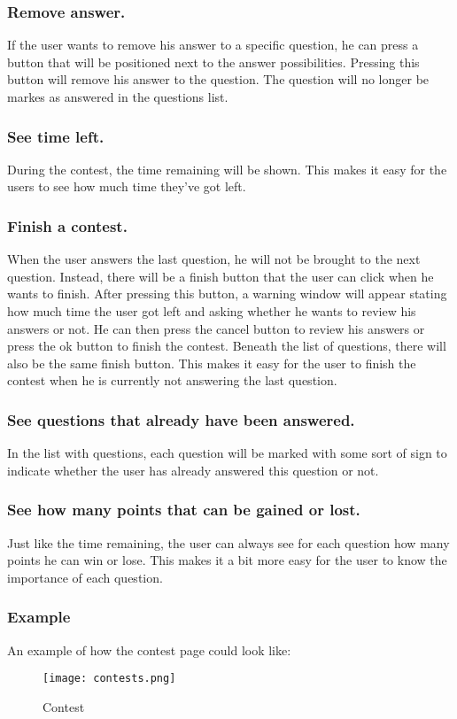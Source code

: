\subsubsection{Remove answer.} 
If the user wants to remove his answer to a specific question, he can press a button that will be positioned next to the answer possibilities. Pressing this button will remove his answer to the question. The question will no longer be markes as answered in the questions list.

\subsubsection{See time left.} 
During the contest, the time remaining will be shown. This makes it easy for the users to see how much time they've got left. 

\subsubsection{Finish a contest.} 
When the user answers the last question, he will not be brought to the next question. Instead, there will be a finish button that the user can click when he wants to finish. After pressing this button, a warning window will appear stating how much time the user got left and asking whether he wants to review his answers or not. He can then press the cancel button to review his answers or press the ok button to finish the contest. Beneath the list of questions, there will also be the same finish button. This makes it easy for the user to finish the contest when he is currently not answering the last question. 

\subsubsection{See questions that already have been answered.} 
In the list with questions, each question will be marked with some sort of sign to indicate whether the user has already answered this question or not. 

\subsubsection{See how many points that can be gained or lost.}
Just like the time remaining, the user can always see for each question how many points he can win or lose. This makes it a bit more easy for the user to know the importance of each question. 

\subsubsection{Example}
An example of how the contest page could look like: 
		\begin{figure}[h]
		  \centering
			\texttt{[image: contests.png]}
		  \caption{Contest}
		  \label{Contest}
		\end{figure}

